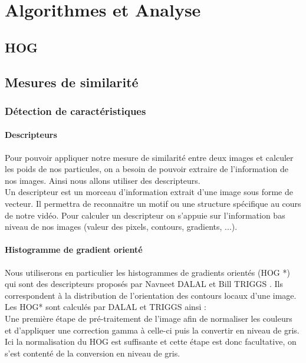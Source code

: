 \chapter{Algorithmes et Analyse}




\section{HOG}




\section{Mesures de similarité}

\subsection{Détection de caractéristiques}

\subsubsection{Descripteurs}

Pour pouvoir appliquer notre mesure de similarité entre deux images et calculer les poids de nos particules, on a besoin de pouvoir extraire de l'information de nos images. Ainsi nous allons utiliser des descripteurs. \\
Un descripteur est un morceau d'information extrait d'une image sous forme de vecteur. Il permettra de reconnaitre un motif ou une structure spécifique au cours de notre vidéo. Pour calculer un descripteur on s'appuie sur l'information bas niveau de nos images (valeur des pixels, contours, gradients, ...).

\subsubsection{Histogramme de gradient orienté}

Nous utiliserons en particulier les histogrammes de gradients orientés (HOG *) qui sont des descripteurs proposés par Navneet DALAL et Bill TRIGGS \cite{dalal_histograms_2005}. Ils correspondent à la distribution de l'orientation des contours locaux d'une image. \\

Les HOG* sont calculés par DALAL et TRIGGS ainsi : \\

Une première étape de pré-traitement de l'image afin de normaliser les couleurs et d'appliquer une correction gamma à celle-ci puis la convertir en niveau de gris. Ici la normalisation du HOG est suffisante et cette étape est donc facultative, on s'est contenté de la conversion en niveau de gris. \\

